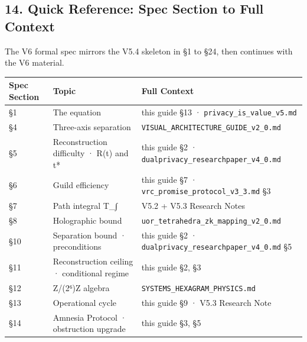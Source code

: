 \documentclass[
  11pt,
]{article}
\newcounter{none} %
\begin{document}
\subsection{14. Quick Reference: Spec Section to Full
Context}\label{quick-reference-spec-section-to-full-context}

The V6 formal spec mirrors the V5.4 skeleton in §1 to §24, then
continues with the V6 material.

{\def\LTcaptype{none} %
\begin{longtable}[]{@{}
  >{\raggedright\arraybackslash}p{}
  >{\raggedright\arraybackslash}p{}
  >{\raggedright\arraybackslash}p{}@{}}
\toprule\noalign{}
\begin{minipage}[b]{\linewidth}\raggedright
Spec Section
\end{minipage} & \begin{minipage}[b]{\linewidth}\raggedright
Topic
\end{minipage} & \begin{minipage}[b]{\linewidth}\raggedright
Full Context
\end{minipage} \\
\midrule\noalign{}
\endhead
\bottomrule\noalign{}
\endlastfoot
§1 & The equation & this guide §13 ·
\texttt{privacy\_is\_value\_v5.md} \\
§4 & Three-axis separation &
\texttt{VISUAL\_ARCHITECTURE\_GUIDE\_v2\_0.md} \\
§5 & Reconstruction difficulty · R(t) and t* & this guide §2 ·
\texttt{dualprivacy\_researchpaper\_v4\_0.md} \\
§6 & Guild efficiency & this guide §7 ·
\texttt{vrc\_promise\_protocol\_v3\_3.md} §3 \\
§7 & Path integral T\_∫ & V5.2 + V5.3 Research Notes \\
§8 & Holographic bound &
\texttt{uor\_tetrahedra\_zk\_mapping\_v2\_0.md} \\
§10 & Separation bound · preconditions & this guide §2 ·
\texttt{dualprivacy\_researchpaper\_v4\_0.md} §5 \\
§11 & Reconstruction ceiling · conditional regime & this guide §2, §3 \\
§12 & Z/(2⁶)Z algebra & \texttt{SYSTEMS\_HEXAGRAM\_PHYSICS.md} \\
§13 & Operational cycle & this guide §9 · V5.3 Research Note \\
§14 & Amnesia Protocol · obstruction upgrade & this guide §3, §5 \\

\end{longtable}}
\end{document}
